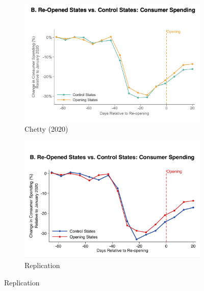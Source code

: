 \documentclass[12pt,letterpaper]{article}
\begin{document}
\begin{figure}
    \centering
    \caption{}
    \begin{subfigure}[t]{0.8\textwidth}
        \centering
        \includegraphics[width=\linewidth]{ChettySpendingGraph.png} 
        \caption{Chetty (2020)} 
        \label{fig:spendC}
    \end{subfigure}

    \begin{subfigure}[t]{0.8\textwidth}
        \centering
        \includegraphics[width=\linewidth]{SpendingGraph.pdf} 
        \caption{Replication} 
        \label{fig:spend}
    \end{subfigure}
\end{figure}

\clearpage
\end{document}

